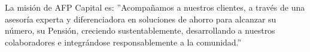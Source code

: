La misión de AFP Capital es: ''Acompañamos a nuestros clientes, a través de una asesoría experta y diferenciadora en soluciones de ahorro para alcanzar su número, su Pensión, creciendo sustentablemente, desarrollando a nuestros colaboradores e integrándose responsablemente a la comunidad.'' \cite{afpcapital}
